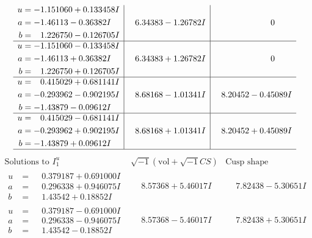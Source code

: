 \documentclass[1p]{elsarticle_modified}
\theoremstyle{definition}
\newcommand{\I}{\sqrt{-1}}
\begin{document}
$$\begin{array}{c|c|c}
\begin{aligned}
u &= -1.151060 + 0.133458 I \\
a &= -1.46113 - 0.36382 I \\
b &= \phantom{-}1.226750 - 0.126705 I\end{aligned}
 & \phantom{-}6.34383 - 1.26782 I & \phantom{-0.000000 } 0 \\ \hline\begin{aligned}
u &= -1.151060 - 0.133458 I \\
a &= -1.46113 + 0.36382 I \\
b &= \phantom{-}1.226750 + 0.126705 I\end{aligned}
 & \phantom{-}6.34383 + 1.26782 I & \phantom{-0.000000 } 0 \\ \hline\begin{aligned}
u &= \phantom{-}0.415029 + 0.681141 I \\
a &= -0.293962 - 0.902195 I \\
b &= -1.43879 - 0.09612 I\end{aligned}
 & \phantom{-}8.68168 - 1.01341 I & \phantom{-}8.20452 - 0.45089 I \\ \hline\begin{aligned}
u &= \phantom{-}0.415029 - 0.681141 I \\
a &= -0.293962 + 0.902195 I \\
b &= -1.43879 + 0.09612 I\end{aligned}
 & \phantom{-}8.68168 + 1.01341 I & \phantom{-}8.20452 + 0.45089 I\\
 \hline 
 \end{array}$$\newpage$$\begin{array}{c|c|c}  
\text{Solutions to }I^u_{1}& \I (\text{vol} + \sqrt{-1}CS) & \text{Cusp shape}\\
 \hline 
\begin{aligned}
u &= \phantom{-}0.379187 + 0.691000 I \\
a &= \phantom{-}0.296338 + 0.946075 I \\
b &= \phantom{-}1.43542 + 0.18852 I\end{aligned}
 & \phantom{-}8.57368 + 5.46017 I & \phantom{-}7.82438 - 5.30651 I \\ \hline\begin{aligned}
u &= \phantom{-}0.379187 - 0.691000 I \\
a &= \phantom{-}0.296338 - 0.946075 I \\
b &= \phantom{-}1.43542 - 0.18852 I\end{aligned}
 & \phantom{-}8.57368 - 5.46017 I & \phantom{-}7.82438 + 5.30651 I \\ \hline\begin{aligned}

\end{aligned}
\end{array}$$
\end{document}
